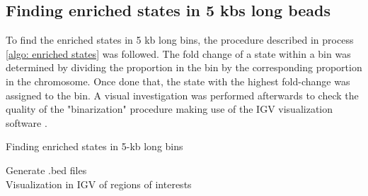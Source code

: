 \subsection{Finding enriched states in 5 kbs long beads} \label{methods: finding enriched states}

To find the enriched states in 5 kb long bins, the procedure described in process \ref{algo: enriched states} was followed. The fold change of a state within a bin was determined by dividing the proportion in the bin by the corresponding proportion in the chromosome. Once done that, the state with the highest fold-change was assigned to the bin. A visual investigation was performed afterwards to check the quality of the "binarization" procedure making use of the IGV visualization software
\cite{robinsonIgvJsEmbeddable2020}.

\begin{algorithm}
    \caption{Finding enriched states in 5-kb long bins}\label{algo: enriched states}
    Generate .bed files\\
    Visualization in IGV of regions of interests\\
\end{algorithm}

